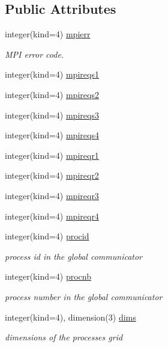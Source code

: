 \subsection*{Public Attributes}
\begin{DoxyCompactItemize}
\item 
integer(kind=4) \hyperlink{classmodmpicom_a500c48035640d6e5b49b1b694372bcd3}{mpierr}
\begin{DoxyCompactList}\small\item\em M\-P\-I error code. \end{DoxyCompactList}\item 
integer(kind=4) \hyperlink{classmodmpicom_a34052e13410e6236c45dcfc1b5563200}{mpireqs1}
\item 
integer(kind=4) \hyperlink{classmodmpicom_a24670bd8507b230a6be2c2f3afabf5c1}{mpireqs2}
\item 
integer(kind=4) \hyperlink{classmodmpicom_a7105e5547fa246381624c998c59249b9}{mpireqs3}
\item 
integer(kind=4) \hyperlink{classmodmpicom_a848fe3dd718230ed7fb98e58796619ea}{mpireqs4}
\item 
integer(kind=4) \hyperlink{classmodmpicom_ac22bfba3e611102e10fdfd1de038f25f}{mpireqr1}
\item 
integer(kind=4) \hyperlink{classmodmpicom_a825f1ba2f76e8ca1c71b11f4e7b29815}{mpireqr2}
\item 
integer(kind=4) \hyperlink{classmodmpicom_a3d9bf986389786c043540894df1ad003}{mpireqr3}
\item 
integer(kind=4) \hyperlink{classmodmpicom_a7a50a2ea228f57406a2f246a57016fa9}{mpireqr4}
\item 
integer(kind=4) \hyperlink{classmodmpicom_a0a592a5f03c3c0d61e07b5a56fd161d1}{procid}
\begin{DoxyCompactList}\small\item\em process id in the global communicator \end{DoxyCompactList}\item 
integer(kind=4) \hyperlink{classmodmpicom_a5e40853b0f15e4c14658ea56fb1b9b73}{procnb}
\begin{DoxyCompactList}\small\item\em process number in the global communicator \end{DoxyCompactList}\item 
integer(kind=4), dimension(3) \hyperlink{classmodmpicom_a8762b65024b222a0c5bfab4f8af21d7d}{dims}
\begin{DoxyCompactList}\small\item\em dimensions of the processes grid \end{DoxyCompactList}\item 

\end{DoxyCompactItemize}
